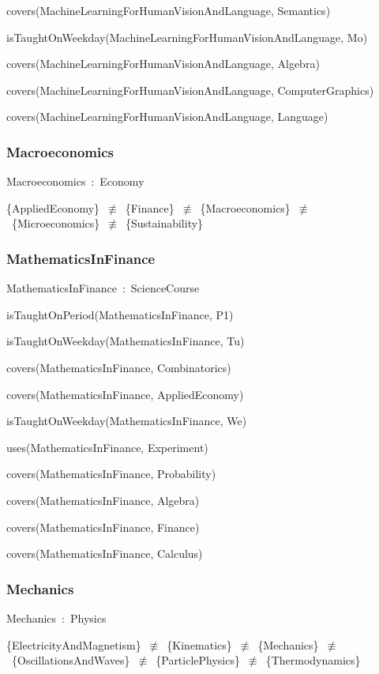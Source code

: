 \documentclass{article}
\begin{document}
covers(MachineLearningForHumanVisionAndLanguage, Semantics)

isTaughtOnWeekday(MachineLearningForHumanVisionAndLanguage, Mo)

covers(MachineLearningForHumanVisionAndLanguage, Algebra)

covers(MachineLearningForHumanVisionAndLanguage, ComputerGraphics)

covers(MachineLearningForHumanVisionAndLanguage, Language)

\subsubsection*{Macroeconomics}

Macroeconomics~:~Economy

\{AppliedEconomy\}~\ensuremath{\not\equiv}~\{Finance\}~\ensuremath{\not\equiv}~\{Macroeconomics\}~\ensuremath{\not\equiv}~\{Microeconomics\}~\ensuremath{\not\equiv}~\{Sustainability\}

\subsubsection*{MathematicsInFinance}

MathematicsInFinance~:~ScienceCourse

isTaughtOnPeriod(MathematicsInFinance, P1)

isTaughtOnWeekday(MathematicsInFinance, Tu)

covers(MathematicsInFinance, Combinatorics)

covers(MathematicsInFinance, AppliedEconomy)

isTaughtOnWeekday(MathematicsInFinance, We)

uses(MathematicsInFinance, Experiment)

covers(MathematicsInFinance, Probability)

covers(MathematicsInFinance, Algebra)

covers(MathematicsInFinance, Finance)

covers(MathematicsInFinance, Calculus)

\subsubsection*{Mechanics}

Mechanics~:~Physics

\{ElectricityAndMagnetism\}~\ensuremath{\not\equiv}~\{Kinematics\}~\ensuremath{\not\equiv}~\{Mechanics\}~\ensuremath{\not\equiv}~\{OscillationsAndWaves\}~\ensuremath{\not\equiv}~\{ParticlePhysics\}~\ensuremath{\not\equiv}~\{Thermodynamics\}
\end{document}
